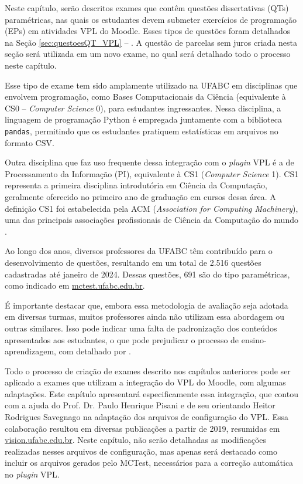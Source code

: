 \label{ch:examesQT_VPL}

Neste capítulo, serão descritos exames que contêm questões dissertativas (QTs) paramétricas, nas quais os estudantes devem submeter exercícios de programação (EPs) em atividades VPL do Moodle. Esses tipos de questões foram detalhados na Seção \ref{sec:questoesQT_VPL} -- . A questão de parcelas sem juros criada nesta seção será utilizada em um novo exame, no qual será detalhado todo o processo neste capítulo.

Esse tipo de exame tem sido amplamente utilizado na UFABC em disciplinas que envolvem programação, como Bases Computacionais da Ciência (equivalente à CS0 -- \textit{Computer Science} 0), para estudantes ingressantes. Nessa disciplina, a linguagem de programação Python é empregada juntamente com a biblioteca \verb|pandas|, permitindo que os estudantes pratiquem estatísticas em arquivos no formato CSV.

Outra disciplina que faz uso frequente dessa integração com o \textit{plugin} VPL é a de Processamento da Informação (PI), equivalente à CS1 (\textit{Computer Science} 1). CS1 representa a primeira disciplina introdutória em Ciência da Computação, geralmente oferecido no primeiro ano de graduação em cursos dessa área. A definição CS1 foi estabelecida pela ACM (\textit{Association for Computing Machinery}), uma das principais associações profissionais de Ciência da Computação do mundo \cite{hogan2023cs0}.

Ao longo dos anos, diversos professores da UFABC têm contribuído para o desenvolvimento de questões, resultando em um total de 2.516 questões cadastradas até janeiro de 2024. Dessas questões, 691 são do tipo paramétricas, como indicado em \href{http://mctest.ufabc.edu.br/}{mctest.ufabc.edu.br}.

É importante destacar que, embora essa metodologia de avaliação seja adotada em diversas turmas, muitos professores ainda não utilizam essa abordagem ou outras similares. Isso pode indicar uma falta de padronização dos conteúdos apresentados aos estudantes, o que pode prejudicar o processo de ensino-aprendizagem, com detalhado por .

Todo o processo de criação de exames descrito nos capítulos anteriores pode ser aplicado a exames que utilizam a integração do VPL do Moodle, com algumas adaptações. Este capítulo apresentará especificamente essa integração, que contou com a ajuda do Prof. Dr. Paulo Henrique Pisani e de seu orientando Heitor Rodrigues Savegnago na adaptação dos arquivos de configuração do VPL. Essa colaboração resultou em diversas publicações a partir de 2019, resumidas em \href{http://vision.ufabc.edu.br}{vision.ufabc.edu.br}. Neste capítulo, não serão detalhadas as modificações realizadas nesses arquivos de configuração, mas apenas será destacado como incluir os arquivos gerados pelo MCTest, necessários para a correção automática no \textit{plugin} VPL.




